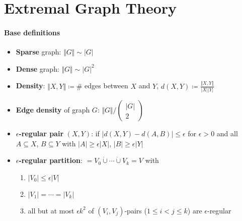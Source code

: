 \section{Extremal Graph Theory}

\paragraph{Base definitions}
\begin{itemize}
  \item \textbf{Sparse} graph: $ \Vert G \Vert \sim \vert G \vert $ 
  \item \textbf{Dense} graph: $ \Vert G \Vert \sim \vert G \vert^2 $
  \item \textbf{Density}: $ \Vert X,Y \Vert \coloneqq \# $ edges between $ X $ and $ Y $, $ d(X,Y) \coloneqq \frac{\Vert X,Y \Vert}{\vert X \vert\vert Y \vert} $  
  \item \textbf{Edge density} of graph $ G $: $ \Vert G \Vert / \left(\begin{smallmatrix}
    \vert G \vert \\ 2
  \end{smallmatrix}\right) $
  \item \textbf{$ \epsilon $-regular pair} $ (X,Y) $: if $ \vert d(X,Y) - d(A,B) \vert \leq \epsilon $ for $ \epsilon > 0 $ and all $ A \subseteq X $, $ B \subseteq Y $ with $ \vert A \vert \geq \epsilon \vert X \vert $, $ \vert B \vert \geq \epsilon \vert Y \vert $
  \item \textbf{$ \epsilon $-regular partition}: $ = V_0 \dot{\cup} \cdots \dot{\cup} V_k = V $ with
  \begin{enumerate}
    \item $ \vert V_0 \vert \leq \epsilon \vert V \vert $ 
    \item $ \vert V_1 \vert = \cdots = \vert V_k \vert $
    \item all but at most $ \epsilon k^2 $ of $ (V_i,V_j) $-pairs ($ 1 \leq i < j \leq k $) are $ \epsilon $-regular
  \end{enumerate}
\end{itemize}

